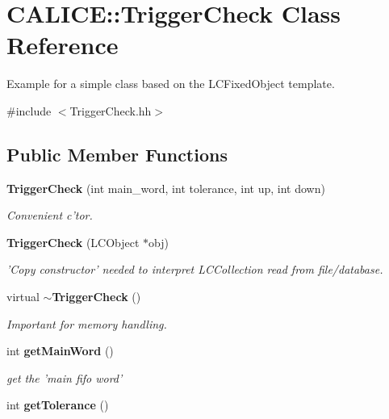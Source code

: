 \section{CALICE::TriggerCheck Class Reference}
\label{classCALICE_1_1TriggerCheck}


Example for a simple class based on the LCFixedObject template.  


{\ttfamily \#include $<$TriggerCheck.hh$>$}\subsection*{Public Member Functions}
\begin{DoxyCompactItemize}
\item 
{\bf TriggerCheck} (int main\_\-word, int tolerance, int up, int down)\label{classCALICE_1_1TriggerCheck_a5c6ad83c6479b1155434bd966137761e}

\begin{DoxyCompactList}\small\item\em Convenient c'tor. \item\end{DoxyCompactList}\item 
{\bf TriggerCheck} (LCObject $\ast$obj)\label{classCALICE_1_1TriggerCheck_a212c6fc6145b9283fabe58679d934f74}

\begin{DoxyCompactList}\small\item\em 'Copy constructor' needed to interpret LCCollection read from file/database. \item\end{DoxyCompactList}\item 
virtual {\bf $\sim$TriggerCheck} ()\label{classCALICE_1_1TriggerCheck_afcadb8b8d10fb40e64ec9656e1984e01}

\begin{DoxyCompactList}\small\item\em Important for memory handling. \item\end{DoxyCompactList}\item 
int {\bf getMainWord} ()\label{classCALICE_1_1TriggerCheck_a3f9131b5775e8b27f6808f0e3b93acbb}

\begin{DoxyCompactList}\small\item\em get the 'main fifo word' \item\end{DoxyCompactList}\item 
int {\bf getTolerance} ()\label{classCALICE_1_1TriggerCheck_afc050c6e51084f4e76a20d694bc73126}


\end{DoxyCompactItemize}
